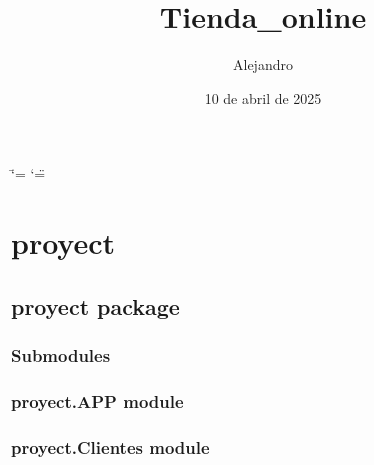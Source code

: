 \documentclass[letterpaper,10pt,spanish]{sphinxmanual}
\title{Tienda\_online}
\date{10 de abril de 2025}
\author{Alejandro}
\begin{document}
\ifdefined\shorthandoff
  \ifnum\catcode`\=\string=\active\shorthandoff{=}\fi
  \ifnum\catcode`\"=\active{}\fi
\fi

\pagestyle{empty}
\sphinxmaketitle
\pagestyle{plain}
\sphinxtableofcontents
\pagestyle{normal}
\label{\detokenize{index::doc}}


\sphinxstepscope


\chapter{proyect}
\label{\detokenize{modules:proyect}}\label{\detokenize{modules::doc}}
\sphinxstepscope


\section{proyect package}
\label{\detokenize{proyect:proyect-package}}\label{\detokenize{proyect::doc}}

\subsection{Submodules}
\label{\detokenize{proyect:submodules}}

\subsection{proyect.APP module}
\label{\detokenize{proyect:proyect-app-module}}

\subsection{proyect.Clientes module}
\label{\detokenize{proyect:module-proyect.Clientes}}\label{\detokenize{proyect:proyect-clientes-module}}
\end{document}
